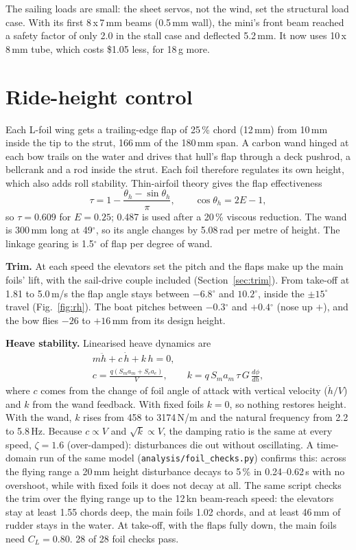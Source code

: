 \documentclass[10pt,twocolumn]{article}
\begin{document}
The sailing loads are small: the sheet servos, not the wind, set the structural load case. With its first 8\,x\,7\,mm beams (0.5\,mm wall), the mini's front beam reached a safety factor of only 2.0 in the stall case and deflected 5.2\,mm. It now uses 10\,x\,8\,mm tube, which costs \$1.05 less, for 18\,g more.

\section{Ride-height control}\label{sec:rh}
Each L-foil wing gets a trailing-edge flap of 25\,\% chord (12\,mm) from 10\,mm inside the tip to the strut, 166\,mm of the 180\,mm span. A carbon wand hinged at each bow trails on the water and drives that hull's flap through a deck pushrod, a bellcrank and a rod inside the strut. Each foil therefore regulates its own height, which also adds roll stability. Thin-airfoil theory gives the flap effectiveness
\begin{equation}
\tau = 1-\frac{\theta_h-\sin\theta_h}{\pi},\qquad \cos\theta_h = 2E-1,
\end{equation}
so $\tau=0.609$ for $E=0.25$; 0.487 is used after a 20\,\% viscous reduction. The wand is 300\,mm long at 49$^\circ$, so its angle changes by 5.08\,rad per metre of height. The linkage gearing is 1.5$^\circ$ of flap per degree of wand.

\noindent\textbf{Trim.} At each speed the elevators set the pitch and the flaps make up the main foils' lift, with the sail-drive couple included (Section~\ref{sec:trim}). From take-off at 1.81 to 5.0\,m/s the flap angle stays between $-6.8$$^\circ$ and $10.2$$^\circ$, inside the $\pm15^\circ$ travel (Fig.~\ref{fig:rh}). The boat pitches between $-0.3$$^\circ$ and $+0.4$$^\circ$ (nose up $+$), and the bow flies $-26$ to $+16$\,mm from its design height.

\noindent\textbf{Heave stability.} Linearised heave dynamics are
\begin{gather}
m\ddot h + c\,\dot h + k\,h = 0,\\
c=\frac{q(S_ma_m+S_ea_e)}{V},\qquad k=q\,S_ma_m\,\tau\,G\,\frac{d\phi}{dh},
\end{gather}
where $c$ comes from the change of foil angle of attack with vertical velocity ($\dot h/V$) and $k$ from the wand feedback. With fixed foils $k=0$, so nothing restores height. With the wand, $k$ rises from 458 to 3174\,N/m and the natural frequency from 2.2 to 5.8\,Hz. Because $c\propto V$ and $\sqrt{k}\propto V$, the damping ratio is the same at every speed, $\zeta=1.6$ (over-damped): disturbances die out without oscillating. A time-domain run of the same model (\texttt{analysis/foil\_checks.py}) confirms this: across the flying range a 20\,mm height disturbance decays to 5\,\% in 0.24--0.62\,s with no overshoot, while with fixed foils it does not decay at all. The same script checks the trim over the flying range up to the 12\,kn beam-reach speed: the elevators stay at least 1.55 chords deep, the main foils 1.02 chords, and at least 46\,mm of rudder stays in the water. At take-off, with the flaps fully down, the main foils need $C_L=0.80$. 28 of 28 foil checks pass.
\end{document}
